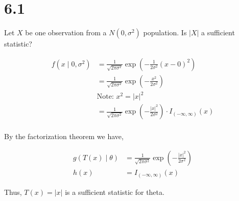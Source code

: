 \section*{6.1}

Let $X$ be one observation from a $N(0, \sigma^2)$ population. Is $|X|$ a sufficient statistic?

\begin{align*}
	f(x\mid 0, \sigma^2) &= \frac{1}{\sqrt{2\pi\sigma^2}} \exp\left( -\frac{1}{2\sigma^2} (x - 0)^2 \right) \\
	&= \frac{1}{\sqrt{2\pi\sigma^2}} \exp\left( -\frac{x^2}{2\sigma^2}  \right) \\
	&\text{Note: } x^2 = |x|^2 \\
	&= \frac{1}{\sqrt{2\pi\sigma^2}} \exp\left( -\frac{|x|^2}{2\sigma^2}  \right) \cdot I_{(-\infty, \infty)}(x) \\
\end{align*}

By the factorization theorem we have,

\begin{align*}
	g(T(x) \mid \theta) &= \frac{1}{\sqrt{2\pi\sigma^2}} \exp\left( -\frac{|x|^2}{2\sigma^2}  \right) \\
	h(x) &= I_{(-\infty, \infty)}(x) 
\end{align*}

Thus, $T(x) = |x|$ is a sufficient statistic for theta.
